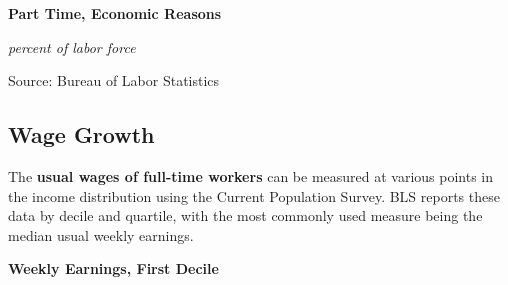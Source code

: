 \documentclass{report}
\makeatletter
\newcommand{\tbllink}[1]{\href{https://raw.githubusercontent.com/bdecon/US-chartbook/master/chartbook/data/#1}{\faTable}}
\newcommand*\short[1]{\expandafter\@gobbletwo\number\numexpr#1\relax}
\newcommand{\shdateaxisticks}{
		date coordinates in=x, axis line style={draw=none},
		xmax={2021-01-01},
		max space between ticks=40,	    
		xtick={{1990-01-01}, {1995-01-01}, {2000-01-01}, 
			{2005-01-01}, {2010-01-01}, {2015-01-01}, {2020-01-01}},
		minor xtick={},
		enlarge y limits={0.06}, enlarge x limits={0.01},
		}
\newcommand{\stdline}[4]{\addplot[very thick, no markers, color=#1] 
		table [x=#2, y=#3, col sep=comma] {#4};	}
\newcommand{\rbars}{
		\fill[color=black!10] (axis cs:{1990-07-01},\pgfkeysvalueof{/pgfplots/ymin}) rectangle 
			(axis cs:{1991-03-01}, \pgfkeysvalueof{/pgfplots/ymax});
		\fill[color=black!10] (axis cs:{2007-12-01},\pgfkeysvalueof{/pgfplots/ymin}) rectangle 
			(axis cs:{2009-07-01}, \pgfkeysvalueof{/pgfplots/ymax});
		\fill[color=black!10] (axis cs:{2001-03-01},\pgfkeysvalueof{/pgfplots/ymin}) rectangle 
			(axis cs:{2001-11-01}, \pgfkeysvalueof{/pgfplots/ymax});
		\fill[color=black!10] (axis cs:{2020-02-01},\pgfkeysvalueof{/pgfplots/ymin}) rectangle 
			(axis cs:{2020-09-01}, \pgfkeysvalueof{/pgfplots/ymax});}
\makeatother
\begin{document}
{{{{{{{{{\begin{minipage}{0.43\textwidth}

\normalsize \textbf{Part Time, Economic Reasons}

\footnotesize{\textit{percent of labor force}}

\hspace*{-2mm} 

\footnotesize{Source: Bureau of Labor Statistics} \hfill \tbllink{ptecon.csv} 
\end{minipage}
\hspace{7mm}
\begin{minipage}{0.28\textwidth}
\small 
\end{minipage}



\newpage

\begin{minipage}{0.76\textwidth}

\subsection*{\color{black!70} \seriffont Wage Growth}

\small The \textbf{usual wages of full-time workers} can be measured at various points in the income distribution using the Current Population Survey. BLS reports these data by decile and quartile, with the most commonly used measure being the median usual weekly earnings.\\



\vspace{5mm}

\normalsize \textbf{Weekly Earnings, First Decile} 


\end{minipage}}}}}}}}}}
\end{document}
